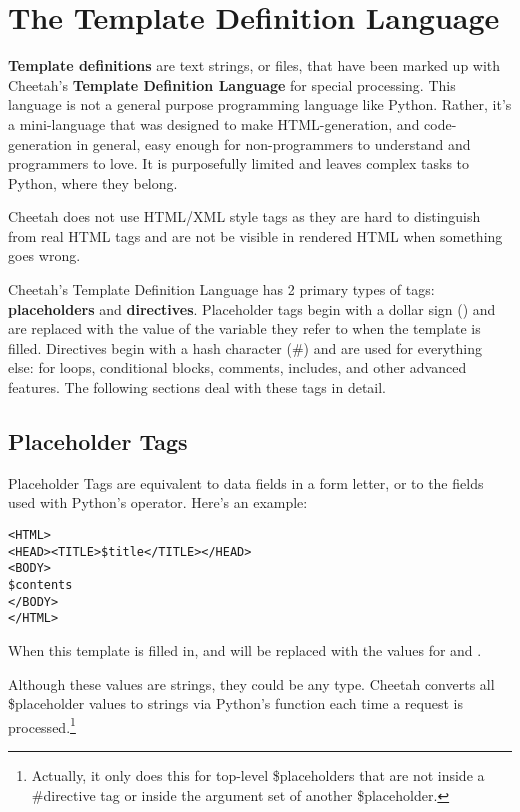 \section{The Template Definition Language}
\label{TDL}

{\bf Template definitions} are text strings, or files, that have been marked up
with Cheetah's {\bf Template Definition Language} for special processing.  This
language is not a general purpose programming language like Python.  Rather,
it's a mini-language that was designed to make HTML-generation, and
code-generation in general, easy enough for non-programmers to understand and
programmers to love.  It is purposefully limited and leaves complex tasks to
Python, where they belong.

Cheetah does not use HTML/XML style tags as they are hard to distinguish from
real HTML tags and are not be visible in rendered HTML when something goes
wrong.

Cheetah's Template Definition Language has 2 primary types of tags: {\bf
  placeholders} and {\bf directives}. Placeholder tags begin with a dollar sign
() and are replaced with the value of the variable they refer to
when the template is filled. Directives begin with a hash character (\#) and are
used for everything else: for loops, conditional blocks, comments, includes, and
other advanced features. The following sections deal with these tags in detail.

\subsection{Placeholder Tags}
\label{TDL.placeholders}
Placeholder Tags are equivalent to data fields in a form letter, or to the
 fields used with Python's \code{\%} operator. Here's an example:

\begin{verbatim}
<HTML>
<HEAD><TITLE>$title</TITLE></HEAD>
<BODY>
$contents
</BODY>
</HTML>
\end{verbatim}

When this template is filled in,  and  will be
replaced with the values for  and .  

Although these values are strings, they could be any type.  Cheetah converts all
\$placeholder values to strings via Python's  function each time a
request is processed.\footnote{Actually, it only does this for top-level
  \$placeholders that are not inside a \#directive tag or inside the argument
  set of another \$placeholder.}

